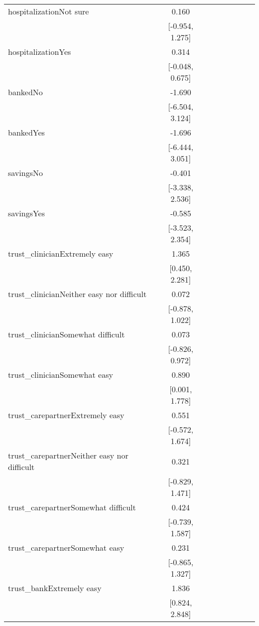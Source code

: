 \begin{tiny}
\begin{xltabular}{\textwidth}{lccccccc}
hospitalizationNot sure & 0.160 &  &  &  &  &  &  \\ 
 & [-0.954, 1.275] &  &  &  &  &  &  \\ 
hospitalizationYes & 0.314 &  &  &  &  &  &  \\ 
 & [-0.048, 0.675] &  &  &  &  &  &  \\ 
bankedNo & -1.690 &  &  &  &  &  &  \\ 
 & [-6.504, 3.124] &  &  &  &  &  &  \\ 
bankedYes & -1.696 &  &  &  &  &  &  \\ 
 & [-6.444, 3.051] &  &  &  &  &  &  \\ 
savingsNo & -0.401 &  &  &  &  &  &  \\ 
 & [-3.338, 2.536] &  &  &  &  &  &  \\ 
savingsYes & -0.585 &  &  &  &  &  &  \\ 
 & [-3.523, 2.354] &  &  &  &  &  &  \\ 
trust\_clinicianExtremely easy & 1.365 &  &  &  &  &  &  \\ 
 & [0.450, 2.281] &  &  &  &  &  &  \\ 
trust\_clinicianNeither easy nor difficult & 0.072 &  &  &  &  &  &  \\ 
 & [-0.878, 1.022] &  &  &  &  &  &  \\ 
trust\_clinicianSomewhat difficult & 0.073 &  &  &  &  &  &  \\ 
 & [-0.826, 0.972] &  &  &  &  &  &  \\ 
trust\_clinicianSomewhat easy & 0.890 &  &  &  &  &  &  \\ 
 & [0.001, 1.778] &  &  &  &  &  &  \\ 
trust\_carepartnerExtremely easy & 0.551 &  &  &  &  &  &  \\ 
 & [-0.572, 1.674] &  &  &  &  &  &  \\ 
trust\_carepartnerNeither easy nor difficult & 0.321 &  &  &  &  &  &  \\ 
 & [-0.829, 1.471] &  &  &  &  &  &  \\ 
trust\_carepartnerSomewhat difficult & 0.424 &  &  &  &  &  &  \\ 
 & [-0.739, 1.587] &  &  &  &  &  &  \\ 
trust\_carepartnerSomewhat easy & 0.231 &  &  &  &  &  &  \\ 
 & [-0.865, 1.327] &  &  &  &  &  &  \\ 
trust\_bankExtremely easy & 1.836 &  &  &  &  &  &  \\ 
 & [0.824, 2.848] &  &  &  &  &  &  \\ 

\end{xltabular}
\end{tiny}
